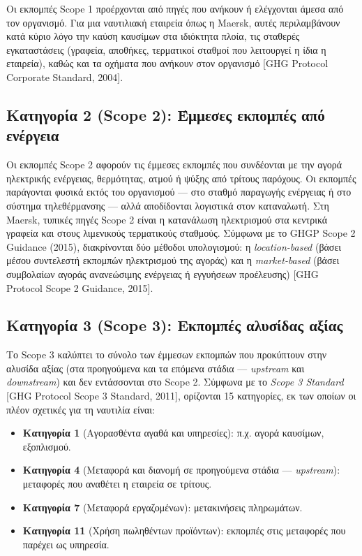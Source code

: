 \documentclass[11pt,a4paper,greek,twoside]{template-xe}
\providecommand{\tightlist}{\setlength{\itemsep}{0pt}\setlength{\parskip}{0pt}}
\begin{document}
Οι εκπομπές Scope 1 προέρχονται από πηγές που ανήκουν ή ελέγχονται άμεσα
από τον οργανισμό. Για μια ναυτιλιακή εταιρεία όπως η Maersk, αυτές
περιλαμβάνουν κατά κύριο λόγο την καύση καυσίμων στα ιδιόκτητα πλοία,
τις σταθερές εγκαταστάσεις (γραφεία, αποθήκες, τερματικοί σταθμοί που
λειτουργεί η ίδια η εταιρεία), καθώς και τα οχήματα που ανήκουν στον
οργανισμό {[}GHG Protocol Corporate Standard, 2004{]}.

\subsection{Κατηγορία 2 (Scope 2): Έμμεσες εκπομπές από
ενέργεια}\label{ux3baux3b1ux3c4ux3b7ux3b3ux3bfux3c1ux3afux3b1-2-scope-2-ux3adux3bcux3bcux3b5ux3c3ux3b5ux3c2-ux3b5ux3baux3c0ux3bfux3bcux3c0ux3adux3c2-ux3b1ux3c0ux3cc-ux3b5ux3bdux3adux3c1ux3b3ux3b5ux3b9ux3b1}

Οι εκπομπές Scope 2 αφορούν τις έμμεσες εκπομπές που συνδέονται με την
αγορά ηλεκτρικής ενέργειας, θερμότητας, ατμού ή ψύξης από τρίτους
παρόχους. Οι εκπομπές παράγονται φυσικά εκτός του οργανισμού --- στο
σταθμό παραγωγής ενέργειας ή στο σύστημα τηλεθέρμανσης --- αλλά
αποδίδονται λογιστικά στον καταναλωτή. Στη Maersk, τυπικές πηγές Scope 2
είναι η κατανάλωση ηλεκτρισμού στα κεντρικά γραφεία και στους λιμενικούς
τερματικούς σταθμούς. Σύμφωνα με το GHGP Scope 2 Guidance (2015),
διακρίνονται δύο μέθοδοι υπολογισμού: η \emph{location-based} (βάσει
μέσου συντελεστή εκπομπών ηλεκτρισμού της αγοράς) και η
\emph{market-based} (βάσει συμβολαίων αγοράς ανανεώσιμης ενέργειας ή
εγγυήσεων προέλευσης) {[}GHG Protocol Scope 2 Guidance, 2015{]}.

\subsection{Κατηγορία 3 (Scope 3): Εκπομπές αλυσίδας
αξίας}\label{ux3baux3b1ux3c4ux3b7ux3b3ux3bfux3c1ux3afux3b1-3-scope-3-ux3b5ux3baux3c0ux3bfux3bcux3c0ux3adux3c2-ux3b1ux3bbux3c5ux3c3ux3afux3b4ux3b1ux3c2-ux3b1ux3beux3afux3b1ux3c2}

Το Scope 3 καλύπτει το σύνολο των έμμεσων εκπομπών που προκύπτουν στην
αλυσίδα αξίας (στα προηγούμενα και τα επόμενα στάδια --- \emph{upstream}
και \emph{downstream}) και δεν εντάσσονται στο Scope 2. Σύμφωνα με το
\emph{Scope 3 Standard} {[}GHG Protocol Scope 3 Standard, 2011{]},
ορίζονται 15 κατηγορίες, εκ των οποίων οι πλέον σχετικές για τη ναυτιλία
είναι:

\begin{itemize}
\tightlist
\item
  \textbf{Κατηγορία 1} (Αγορασθέντα αγαθά και υπηρεσίες): π.χ. αγορά
  καυσίμων, εξοπλισμού.
\item
  \textbf{Κατηγορία 4} (Μεταφορά και διανομή σε προηγούμενα στάδια ---
  \emph{upstream}): μεταφορές που αναθέτει η εταιρεία σε τρίτους.
\item
  \textbf{Κατηγορία 7} (Μεταφορά εργαζομένων): μετακινήσεις πληρωμάτων.
\item
  \textbf{Κατηγορία 11} (Χρήση πωληθέντων προϊόντων): εκπομπές στις
  μεταφορές που παρέχει ως υπηρεσία.
\end{itemize}
\end{document}
